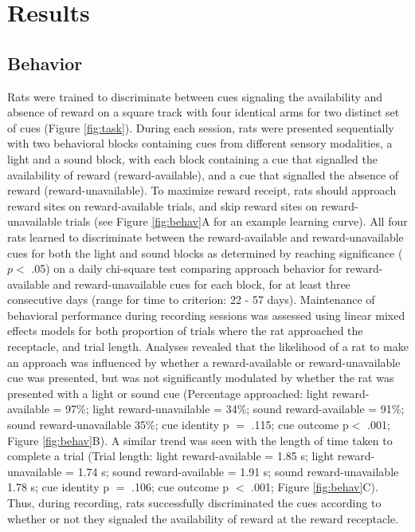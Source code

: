 \documentclass[11pt]{article}
\begin{document}
{\section*{Results}

\subsection*{Behavior}

Rats were trained to discriminate between cues signaling the
availability and absence of reward on a square track with four
identical arms for two distinct set of cues (Figure
\ref{fig:task}). During each session, rats were presented sequentially
with two behavioral blocks containing cues from different sensory
modalities, a light and a sound block, with each block containing a
cue that signalled the availability of reward (reward-available), and
a cue that signalled the absence of reward (reward-unavailable). To
maximize reward receipt, rats should approach reward sites on
reward-available trials, and skip reward sites on reward-unavailable
trials (see Figure \ref{fig:behav}A for an example learning
curve). All four rats learned to discriminate between the
reward-available and reward-unavailable cues for both the light and
sound blocks as determined by reaching significance ($p <$ .05) on a
daily chi-square test comparing approach behavior for reward-available
and reward-unavailable cues for each block, for at least three
consecutive days (range for time to criterion: 22 - 57
days). Maintenance of behavioral performance during recording sessions
was assessed using linear mixed effects models for both proportion of
trials where the rat approached the receptacle, and trial
length. Analyses revealed that the likelihood of a rat to make an
approach was influenced by whether a reward-available or reward-unavailable cue was presented, but was not significantly modulated by whether the rat was presented with a light or sound cue (Percentage
approached: light reward-available = 97\%; light reward-unavailable =
34\%; sound reward-available = 91\%; sound reward-unavailable 35\%; cue identity p
$=$ .115; cue outcome p$<$ .001; Figure \ref{fig:behav}B). A similar trend was seen with the
length of time taken to complete a trial (Trial length: light
reward-available = 1.85 s; light reward-unavailable = 1.74 s; sound
reward-available = 1.91 s; sound reward-unavailable 1.78 s; cue identity p $=$ .106; cue outcome p $<$ .001; Figure \ref{fig:behav}C). Thus, during recording, rats successfully
discriminated the cues according to whether or not they signaled the
availability of reward at the reward receptacle.

}
\end{document}
